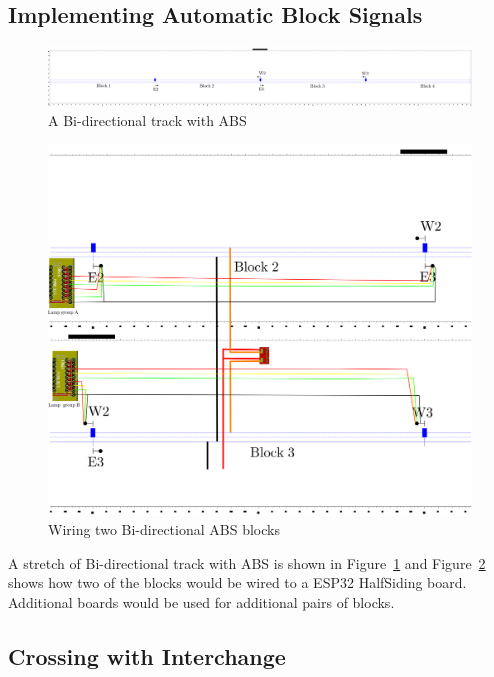 \clearpage
\subsection{Implementing Automatic Block Signals}

\begin{figure}[hbpt]\begin{centering}%
\includegraphics[width=5in]{ABSTrack_Annotated.png}
\caption{A Bi-directional track with ABS}
\label{fig:ABSTrack}
\end{centering}\end{figure}
\begin{figure}[hbpt]\begin{centering}%
\includegraphics[width=5in]{ABSTrack_Wiring.png}
\caption{Wiring two Bi-directional ABS blocks}
\label{fig:ABSTrack_Wiring}
\end{centering}\end{figure}
A stretch of Bi-directional track with ABS is shown in 
Figure~\ref{fig:ABSTrack} and Figure~\ref{fig:ABSTrack_Wiring} shows how two 
of the blocks would be wired to a ESP32 HalfSiding board. Additional boards 
would be used for additional pairs of blocks.


\clearpage
\subsection{Crossing with Interchange}


